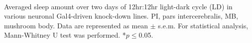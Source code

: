 \label{fig:S5}
\textbf{}
\\
Averaged sleep amount over two days of 12hr:12hr light-dark cycle (LD) in various neuronal Gal4-driven knock-down lines.
PI, pars intercerebralis, MB, mushroom body.
Data are represented as mean $\pm$ s.e.m.
For statistical analysis, Mann-Whitney U test was performed.
*$p\le$0.05.